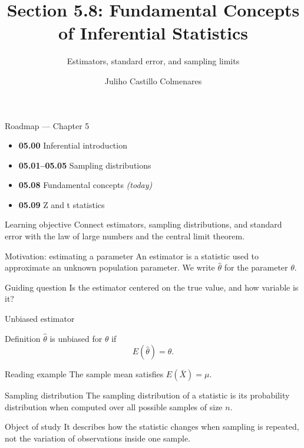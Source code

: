 \documentclass[10pt,aspectratio=169]{beamer}
\title[Fundamental Concepts]{Section 5.8: Fundamental Concepts of Inferential Statistics}
\subtitle{Estimators, standard error, and sampling limits}
\author[J. Castillo Colmenares]{Juliho Castillo Colmenares}
\institute{Tecnológico de Monterrey}
\date{}
\begin{document}
\begin{frame}[plain]\vspace{-0.8cm}\titlepage\end{frame}

\begin{frame}{Roadmap --- Chapter 5}
  \footnotesize
  \begin{itemize}\itemsep=0.08cm
    \item \textbf{05.00} Inferential introduction
    \item \textbf{05.01--05.05} Sampling distributions
    \item \textbf{05.08} Fundamental concepts \emph{(today)}
    \item \textbf{05.09} Z and t statistics
  \end{itemize}
  \begin{block}{Learning objective}
    Connect estimators, sampling distributions, and standard error with the law
    of large numbers and the central limit theorem.
  \end{block}
\end{frame}

\begin{frame}{Motivation: estimating a parameter}
  \footnotesize
  An estimator is a statistic used to approximate an unknown population
  parameter. We write $\hat\theta$ for the parameter $\theta$.
  \begin{alertblock}{Guiding question}
    Is the estimator centered on the true value, and how variable is it?
  \end{alertblock}
\end{frame}

\begin{frame}{Unbiased estimator}
  \footnotesize
  \begin{block}{Definition}
    $\hat\theta$ is unbiased for $\theta$ if
    \[
      E(\hat\theta)=\theta.
    \]
  \end{block}
  \begin{exampleblock}{Reading example}
    The sample mean satisfies $E(\bar X)=\mu$.
  \end{exampleblock}
\end{frame}

\begin{frame}{Sampling distribution}
  \footnotesize
  The sampling distribution of a statistic is its probability distribution when
  computed over all possible samples of size $n$.
  \begin{block}{Object of study}
    It describes how the statistic changes when sampling is repeated, not the
    variation of observations inside one sample.
  \end{block}
\end{frame}
\end{document}

